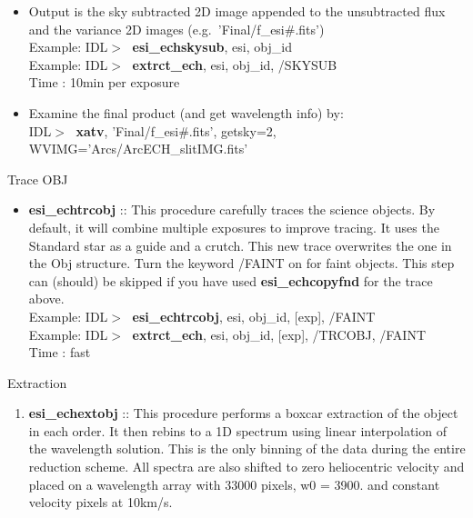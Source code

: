 \documentclass[11pt,letterpaper,dvips]{article}
\begin{document}
\begin{enumerate}
\begin{itemize}
\begin{itemize}
		and 2 places one at each end.  One usually turns on /NOVAC with this
		keyword
	  \item /NOVAC :: Does not apply a vacuum correction to the skyline info.
	  	This probably would only be used with SKLFIL 
	\end{itemize}
	\item Output is the sky subtracted 2D image appended to the unsubtracted
	flux and the variance 2D images (e.g.\ 'Final/f\_esi{\#}.fits') \\
         \quad Example: IDL$> \;$ {\bf esi\_echskysub}, esi, obj\_id \\
         \quad Example: IDL$> \;$ {\bf extrct\_ech}, esi, obj\_id, /SKYSUB \\
         \quad Time   : 10min per exposure \\
	\item Examine the final product (and get wavelength info) by:\\
         \quad IDL$> \;$ {\bf xatv}, 'Final/f\_esi{\#}.fits', getsky=2, 
		WVIMG='Arcs/ArcECH\_{slit}IMG.fits'
  \end{itemize}

{\Large  \item Trace OBJ}
  \begin{itemize}
	\item {\bf esi\_echtrcobj} ::
	This procedure carefully traces the science objects.  
	By default, it will combine multiple exposures to improve tracing.  
	It uses the Standard star as a guide and a crutch.  
	This new trace overwrites the one in the Obj structure. 
	Turn the keyword /FAINT on for faint objects.  This step can (should)
	be skipped if you have used {\bf esi\_echcopyfnd} for 
	the trace above. \\
         \quad Example: IDL$> \;$ {\bf esi\_echtrcobj}, esi, obj\_id, 
		[exp], /FAINT \\
         \quad Example: IDL$> \;$ {\bf extrct\_ech}, esi, obj\_id, 
		[exp], /TRCOBJ, /FAINT\\
         \quad Time   : fast \\
  \end{itemize}


{\Large  \item Extraction}
  \begin{enumerate}
	\item {\bf esi\_echextobj} ::
	This procedure performs a boxcar extraction of the object in each
	order.  It then rebins to a 1D spectrum using linear interpolation
	of the wavelength solution.  This is the only binning of the data
	during the entire reduction scheme.  All spectra are also shifted to
	zero heliocentric velocity and placed on a wavelength array with 
	33000 pixels, w0 = 3900. and constant velocity pixels at 10km/s.


\end{enumerate}
\end{enumerate}
\end{document}
